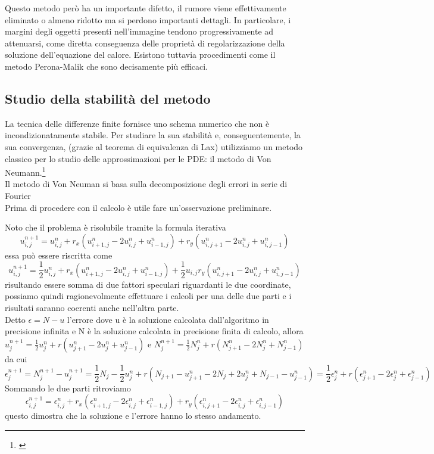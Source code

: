 Questo metodo però ha un importante difetto, il rumore viene effettivamente eliminato o almeno ridotto ma si perdono importanti dettagli. In particolare, i margini degli oggetti presenti nell'immagine tendono progressivamente ad attenuarsi, come diretta conseguenza delle proprietà di regolarizzazione della soluzione dell'equazione del calore. Esistono tuttavia procedimenti come il metodo Perona-Malik che sono decisamente più efficaci.\\


\subsection{Studio della stabilità del metodo}
La tecnica delle differenze finite fornisce uno schema numerico che non è incondizionatamente stabile. Per studiare la sua stabilità e, conseguentemente, la sua convergenza, (grazie al teorema di equivalenza di Lax) utilizziamo un metodo classico per lo studio delle approssimazioni per le PDE:  il metodo di Von Neumann.\footnote{\cite{stab}}\\
Il metodo di Von Neuman si basa sulla decomposizione degli errori in serie di Fourier\\
Prima di procedere con il calcolo è utile fare un'osservazione preliminare.
\begin{osservazione}
Noto che il problema è risolubile tramite la formula iterativa
$$
u_{i,j}^{n+1}=u_{i,j}^{n}+r_{x}(u_{i+1,j}^{n}-2u_{i,j}^{n}+u_{i-1,j}^{n})+r_{y}(u_{i,j+1}^{n}-2u_{i,j}^{n}+u_{i,j-1}^{n})
$$
essa può essere riscritta come
$$
u_{i,j}^{n+1}=\frac{1}{2}u_{i,j}^{n}+r_{x}(u_{i+1,j}^{n}-2u_{i,j}^{n}+u_{i-1,j}^{n})+\frac{1}{2}u_{i,j}r_{y}(u_{i,j+1}^{n}-2u_{i,j}^{n}+u_{i,j-1}^{n})
$$
risultando essere somma di due fattori speculari riguardanti le due coordinate, possiamo quindi ragionevolmente effettuare i calcoli per una delle due parti e i risultati saranno coerenti anche nell'altra parte.\\
Detto $\epsilon=N-u$ l'errore dove u è la soluzione calcolata dall'algoritmo in precisione infinita e N è la soluzione calcolata in precisione finita di calcolo, allora
\hspace{0.5em}
$u_{j}^{n+1}=\frac{1}{2}u_{j}^{n}+r(u_{j+1}^{n}-2u_{j}^{n}+u_{j-1}^{n})$
e
$N_{j}^{n+1}=\frac{1}{2}N_{j}^{n}+r(N_{j+1}^{n}-2N_{j}^{n}+N_{j-1}^{n})$
da cui 
\hspace{-0.25em}
$$
\epsilon_{j}^{n+1}=N_{j}^{n+1}-u_{j}^{n+1}=\frac{1}{2}N_{j}-\frac{1}{2}u_{j}^{n}+r(N_{j+1}-u_{j+1}^{n}-2N_{j}+2u_{j}^{n}+N_{j-1}-u_{j-1}^{n})=\frac{1}{2}\epsilon _{j}^{n}+r(\epsilon_{j+1}^{n}-2\epsilon _{j}^{n}+\epsilon _{j-1}^{n})
$$
Sommando le due parti ritroviamo
$$
\epsilon_{i,j}^{n+1}=\epsilon_{i,j}^{n}+r_{x}(\epsilon_{i+1,j}^{n}-2\epsilon_{i,j}^{n}+\epsilon_{i-1,j}^{n})+r_{y}(\epsilon_{i,j+1}^{n}-2\epsilon_{i,j}^{n}+\epsilon_{i,j-1}^{n})
$$
questo dimostra che la soluzione e l'errore hanno lo stesso andamento.\\
\end{osservazione}
